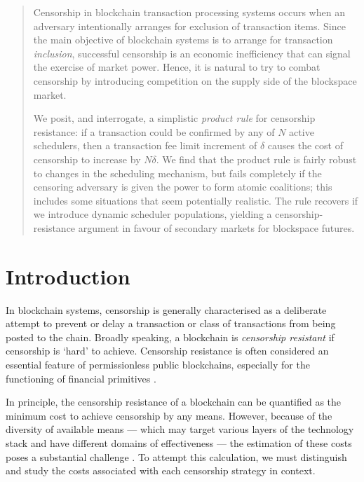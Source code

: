 \maketitle

\begin{abstract}

  Censorship in blockchain transaction processing systems occurs when an adversary intentionally arranges for exclusion of transaction items.
  Since the main objective of blockchain systems is to arrange for transaction \emph{inclusion}, successful censorship is an economic inefficiency that can signal the exercise of market power.
  Hence, it is natural to try to combat censorship by introducing competition on the supply side of the blockspace market.

  We posit, and interrogate, a simplistic \emph{product rule} for censorship resistance: if a transaction could be confirmed by any of $N$ active schedulers, then a transaction fee limit increment of $\delta$ causes the cost of censorship to increase by $N\delta$.
  We find that the product rule is fairly robust to changes in the scheduling mechanism, but fails completely if the censoring adversary is given the power to form atomic coalitions; this includes some situations that seem potentially realistic.
  The rule recovers if we introduce dynamic scheduler populations, yielding a censorship-resistance argument in favour of secondary markets for blockspace futures.
  
\end{abstract}

\section{Introduction}

In blockchain systems, censorship is generally characterised as a deliberate attempt to prevent or delay a transaction or class of transactions from being posted to the chain.
%
Broadly speaking, a blockchain is \emph{censorship resistant} if censorship is `hard' to achieve.
%
Censorship resistance is often considered an essential feature of permissionless public blockchains, especially for the functioning of financial primitives \cite{buterin2015problem}.

In principle, the censorship resistance of a blockchain can be quantified as the minimum cost to achieve censorship by any means.
%
However, because of the diversity of available means --- which may target various layers of the technology stack and have different domains of effectiveness --- the estimation of these costs poses a substantial challenge \cite{wahrstatter2024blockchain}.
%
To attempt this calculation, we must distinguish and study the costs associated with each censorship strategy in context.

